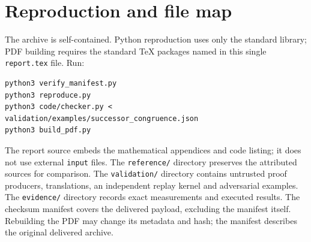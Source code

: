 \documentclass[11pt,letterpaper]{article}
\theoremstyle{definition}\newtheorem{definition}[theorem]{Definition}
\theoremstyle{remark}\newtheorem{remark}[theorem]{Remark}
\begin{document}
\section{Reproduction and file map}
The archive is self-contained. Python reproduction uses only the standard
library; PDF building requires the standard TeX packages named in this
single \texttt{report.tex} file. Run:
\begin{lstlisting}[language={}]
python3 verify_manifest.py
python3 reproduce.py
python3 code/checker.py < validation/examples/successor_congruence.json
python3 build_pdf.py
\end{lstlisting}
The report source embeds the mathematical appendices and code listing;
it does not use external \texttt{input} files. The \texttt{reference/}
directory preserves the attributed sources for comparison. The
\texttt{validation/} directory contains untrusted proof producers,
translations, an independent replay kernel and adversarial examples.
The \texttt{evidence/} directory records exact measurements and executed
results. The checksum manifest covers the delivered payload, excluding
the manifest itself. Rebuilding the PDF may change its metadata and hash;
the manifest describes the original delivered archive.
\end{document}
